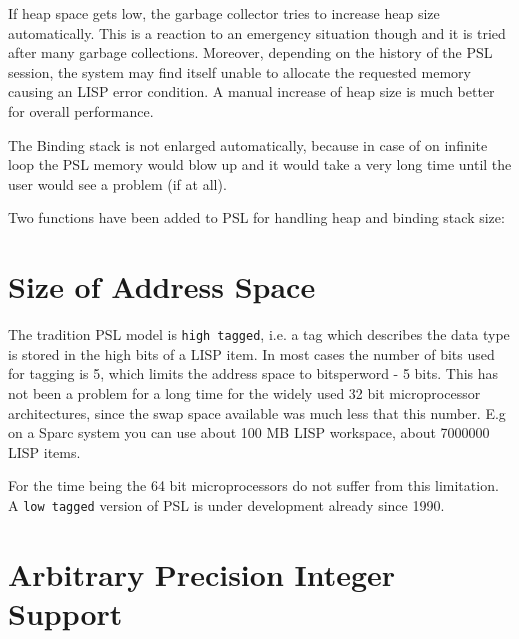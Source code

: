 If heap space gets low, the garbage collector tries to
increase heap size automatically. This is a reaction to an
emergency situation though and it is tried after many garbage
collections.  Moreover, depending on the history of the PSL session,
the system may find itself unable to allocate the requested memory causing
an LISP error condition. A manual increase of heap size 
is much better for overall performance.

The Binding stack is not enlarged automatically, because
in case of on infinite loop the PSL memory would blow up
and it would take a very long time until the user would
see a problem (if at all).

Two functions have been added to PSL
for handling heap and binding stack size:



\section{Size of Address Space}

The tradition PSL model is {\tt high tagged}, i.e. a tag which describes
the data type is stored in the high bits of a LISP item. In most cases
the number of bits used for tagging is 5, which limits the address space
to bitsperword - 5 bits. This has not been a problem for a long time
for the widely used 32 bit microprocessor architectures, 
since the swap space available was much less that this number. E.g
on a Sparc system you can use about 100 MB LISP workspace, about 7000000 
LISP items.

For the time being the 64 bit microprocessors do not suffer from this
limitation. A {\tt low tagged} version of PSL is under development
already since 1990.

\section{Arbitrary Precision Integer Support}

